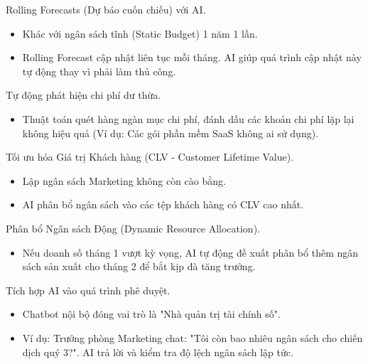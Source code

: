 \documentclass[aspectratio=169]{beamer}
\begin{document}
\begin{frame}{Rolling Forecasts (Dự báo cuốn chiếu) với AI.}
    \begin{itemize}
        \item Khác với ngân sách tĩnh (Static Budget) 1 năm 1 lần.
        \item Rolling Forecast cập nhật liên tục mỗi tháng. AI giúp quá trình cập nhật này tự động thay vì phải làm thủ công.
    \end{itemize}
\end{frame}


\begin{frame}{Tự động phát hiện chi phí dư thừa.}
    \begin{itemize}
        \item Thuật toán quét hàng ngàn mục chi phí, đánh dấu các khoản chi phí lặp lại không hiệu quả (Ví dụ: Các gói phần mềm SaaS không ai sử dụng).
    \end{itemize}
\end{frame}


\begin{frame}{Tối ưu hóa Giá trị Khách hàng (CLV - Customer Lifetime Value).}
    \begin{itemize}
        \item Lập ngân sách Marketing không còn cào bằng.
        \item AI phân bổ ngân sách vào các tệp khách hàng có CLV cao nhất.
    \end{itemize}
\end{frame}


\begin{frame}{Phân bổ Ngân sách Động (Dynamic Resource Allocation).}
    \begin{itemize}
        \item Nếu doanh số tháng 1 vượt kỳ vọng, AI tự động đề xuất phân bổ thêm ngân sách sản xuất cho tháng 2 để bắt kịp đà tăng trưởng.
    \end{itemize}
\end{frame}


\begin{frame}{Tích hợp AI vào quá trình phê duyệt.}
    \begin{itemize}
        \item Chatbot nội bộ đóng vai trò là "Nhà quản trị tài chính số".
        \item Ví dụ: Trưởng phòng Marketing chat: "Tôi còn bao nhiêu ngân sách cho chiến dịch quý 3?". AI trả lời và kiểm tra độ lệch ngân sách lập tức.
    \end{itemize}
\end{frame}
\end{document}
